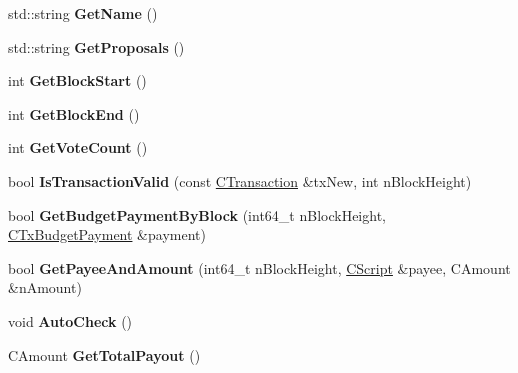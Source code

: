 \begin{DoxyCompactItemize}
std\+::string {\bfseries Get\+Name} ()
\item 
\mbox{\label{class_c_finalized_budget_a49cb2b919e0de352628d6157cfa1e1c8}} 
std\+::string {\bfseries Get\+Proposals} ()
\item 
\mbox{\label{class_c_finalized_budget_adf320ff0b74a982c0aadc5d8a5e168db}} 
int {\bfseries Get\+Block\+Start} ()
\item 
\mbox{\label{class_c_finalized_budget_a45b354d7c3ea65128130cf28e78f4bf4}} 
int {\bfseries Get\+Block\+End} ()
\item 
\mbox{\label{class_c_finalized_budget_a6958b394133bceca95b49c25ce337b06}} 
int {\bfseries Get\+Vote\+Count} ()
\item 
\mbox{\label{class_c_finalized_budget_a32c98c7a24100e099093e7d33b9330f2}} 
bool {\bfseries Is\+Transaction\+Valid} (const \mbox{\hyperlink{class_c_transaction}{C\+Transaction}} \&tx\+New, int n\+Block\+Height)
\item 
\mbox{\label{class_c_finalized_budget_aa5ec8ed8c03ce6bbc1c49edd942501c8}} 
bool {\bfseries Get\+Budget\+Payment\+By\+Block} (int64\+\_\+t n\+Block\+Height, \mbox{\hyperlink{class_c_tx_budget_payment}{C\+Tx\+Budget\+Payment}} \&payment)
\item 
\mbox{\label{class_c_finalized_budget_a75c6ae33fd0079e732e1103d29501d01}} 
bool {\bfseries Get\+Payee\+And\+Amount} (int64\+\_\+t n\+Block\+Height, \mbox{\hyperlink{class_c_script}{C\+Script}} \&payee, C\+Amount \&n\+Amount)
\item 
\mbox{\label{class_c_finalized_budget_a88614fdccb5cdf722403c11832df2ad0}} 
void {\bfseries Auto\+Check} ()
\item 
\mbox{\label{class_c_finalized_budget_a20f2cdac9403d59688b527a98474cc7a}} 
C\+Amount {\bfseries Get\+Total\+Payout} ()
\item 
\mbox{\label{class_c_finalized_budget_a8d5710eaf0fe541dcdce1d5f2ebee51c}} 

\end{DoxyCompactItemize}
